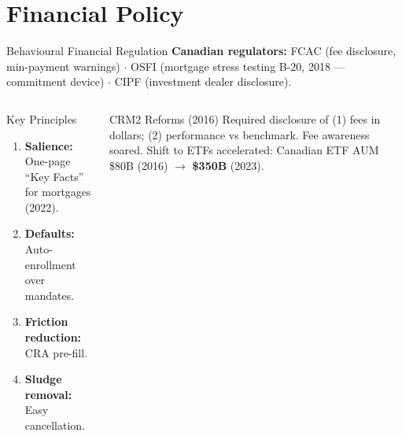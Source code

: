 \documentclass[aspectratio=169]{beamer}
\begin{document}
\section{Financial Policy}

\begin{frame}{Behavioural Financial Regulation}
\textbf{Canadian regulators:} FCAC (fee disclosure, min-payment warnings) $\cdot$ OSFI (mortgage stress testing B-20, 2018 --- commitment device) $\cdot$ CIPF (investment dealer disclosure).
\begin{columns}
\begin{alertblock}{Key Principles}
\begin{enumerate}\small
  \item \textbf{Salience:} One-page ``Key Facts'' for mortgages (2022).
  \item \textbf{Defaults:} Auto-enrollment over mandates.
  \item \textbf{Friction reduction:} CRA pre-fill.
  \item \textbf{Sludge removal:} Easy cancellation.
\end{enumerate}
\end{alertblock}
\begin{exampleblock}{CRM2 Reforms (2016)}
Required disclosure of (1) fees in dollars; (2) performance vs benchmark. Fee awareness soared. Shift to ETFs accelerated: Canadian ETF AUM \$80B (2016) $\to$ \textbf{\$350B} (2023).
\end{exampleblock}
\end{columns}
\end{frame}
\end{document}
